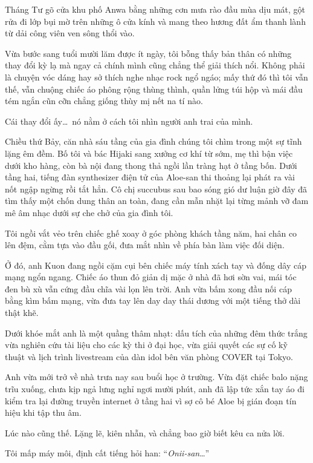 \documentclass[../main.tex]{subfiles}
\begin{document}

Tháng Tư gõ cửa khu phố Anwa bằng những cơn mưa rào đầu mùa dịu mát, gột rửa đi lớp bụi mờ trên những ô cửa kính và mang theo hương đất ẩm thanh lành từ dải công viên ven sông thổi vào.

Vừa bước sang tuổi mười lăm được ít ngày, tôi bỗng thấy bản thân có những thay đổi kỳ lạ mà ngay cả chính mình cũng chẳng thể giải thích nổi. Không phải là chuyện vóc dáng hay sở thích nghe nhạc rock ngổ ngáo; mấy thứ đó thì tôi vẫn thế, vẫn chuộng chiếc áo phông rộng thùng thình, quần lửng túi hộp và mái đầu tém ngắn cũn cỡn chẳng giống thùy mị nết na tí nào.

Cái thay đổi ấy\dots\ nó nằm ở cách tôi nhìn người anh trai của mình.

Chiều thứ Bảy, căn nhà sáu tầng của gia đình chúng tôi chìm trong một sự tĩnh lặng êm đềm. Bố tôi và bác Hijaki sang xưởng cơ khí từ sớm, mẹ thì bận việc dưới kho hàng, còn bà nội đang thong thả ngồi lần tràng hạt ở tầng bốn. Dưới tầng hai, tiếng đàn synthesizer điện tử của Aloe-san thi thoảng lại phát ra vài nốt ngập ngừng rồi tắt hẳn. Cô chị succubus sau bao sóng gió dư luận giờ đây đã tìm thấy một chốn dung thân an toàn, đang cần mẫn nhặt lại từng mảnh vỡ đam mê âm nhạc dưới sự che chở của gia đình tôi.

Tôi ngồi vắt vẻo trên chiếc ghế xoay ở góc phòng khách tầng năm, hai chân co lên đệm, cằm tựa vào đầu gối, đưa mắt nhìn về phía bàn làm việc đối diện.

Ở đó, anh Kuon đang ngồi cặm cụi bên chiếc máy tính xách tay và đống dây cáp mạng ngổn ngang. Chiếc áo thun đỏ giản dị mặc ở nhà đã hơi sờn vai, mái tóc đen bù xù vẫn cứng đầu chĩa vài lọn lên trời. Anh vừa bấm xong đầu nối cáp bằng kìm bấm mạng, vừa đưa tay lên day day thái dương với một tiếng thở dài thật khẽ.

Dưới khóe mắt anh là một quầng thâm nhạt: dấu tích của những đêm thức trắng vừa nghiên cứu tài liệu cho các kỳ thi ở đại học, vừa giải quyết các sự cố kỹ thuật và lịch trình livestream của dàn idol bên văn phòng COVER tại Tokyo.

Anh vừa mới trở về nhà trưa nay sau buổi học ở trường. Vừa đặt chiếc balo nặng trĩu xuống, chưa kịp ngả lưng nghỉ ngơi mười phút, anh đã lập tức xắn tay áo đi kiểm tra lại đường truyền internet ở tầng hai vì sợ cô bé Aloe bị gián đoạn tín hiệu khi tập thu âm.

Lúc nào cũng thế. Lặng lẽ, kiên nhẫn, và chẳng bao giờ biết kêu ca nửa lời.

Tôi mấp máy môi, định cất tiếng hỏi han: ``\textit{Onii-san}\dots''
\end{document}
